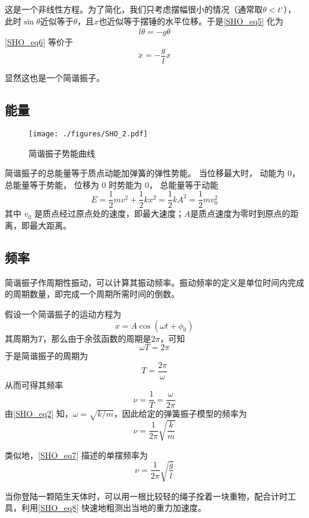 这是一个非线性方程。为了简化，我们只考虑摆幅很小的情况（通常取$\theta<t^\circ$），此时$\sin\theta$近似等于$\theta$，且$x$也近似等于摆锤的水平位移。于是\autoref{SHO_eq5} 化为
\begin{equation}\label{SHO_eq6}
l\ddot{\theta} = -g\theta
\end{equation}
\autoref{SHO_eq6} 等价于
\begin{equation}\label{SHO_eq7}
\ddot{x} = -\frac{g}{l}x
\end{equation}

显然这也是一个简谐振子。



\subsection{能量}

\begin{figure}[ht]
\centering
\texttt{[image: ./figures/SHO\_2.pdf]}
\caption{简谐振子势能曲线} \label{SHO_fig2}
\end{figure}

简谐振子的总能量等于质点动能加弹簧的弹性势能。 当位移最大时， 动能为 0， 总能量等于势能， 位移为 0 时势能为 0， 总能量等于动能
\begin{equation}
E = \frac{1}{2} mv^2 + \frac12 k x^2 = \frac12 k A^2 = \frac12 m v_0^2
\end{equation}
其中 $v_0$ 是质点经过原点处的速度，即最大速度；$A$是质点速度为零时到原点的距离，即最大距离。


\subsection{频率}

简谐振子作周期性振动，可以计算其振动频率。振动频率的定义是单位时间内完成的周期数量，即完成一个周期所需时间的倒数。

假设一个简谐振子的运动方程为
\begin{equation}
x = A\cos(\omega t+\phi_0)
\end{equation}
其周期为$T$，那么由于余弦函数的周期是$2\pi$，可知
\begin{equation}
\omega T = 2\pi
\end{equation}
于是简谐振子的周期为
\begin{equation}
T = \frac{2\pi}{\omega}
\end{equation}
从而可得其频率
\begin{equation}
\nu = \frac{1}{T} = \frac{\omega}{2\pi}
\end{equation}
由\autoref{SHO_eq2} 知，$\omega=\sqrt{k/m}$，因此给定的弹簧振子模型的频率为
\begin{equation}
\nu = \frac{1}{2\pi}\sqrt{\frac{k}{m}}
\end{equation}

类似地，\autoref{SHO_eq7} 描述的单摆频率为
\begin{equation}\label{SHO_eq8}
\nu = \frac{1}{2\pi}\sqrt{\frac{g}{l}}
\end{equation}

当你登陆一颗陌生天体时，可以用一根比较轻的绳子拴着一块重物，配合计时工具，利用\autoref{SHO_eq8} 快速地粗测出当地的重力加速度。













